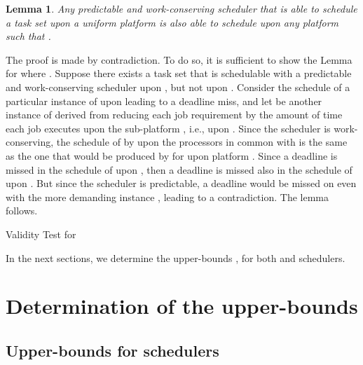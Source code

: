 \documentclass[10pt,english,a4paper]{article}
\newtheorem{lemma}{Lemma}
\newenvironment{proof}[1][Proof]{\begin{trivlist}
\item[\hskip \labelsep {\bfseries #1}]}{\end{trivlist}}
\newtheorem{validity test}{Validity Test}
\newcommand{\fin}{\hfill{\small }}     \newcommand{\oh}[1]{\ensuremath{\mathcal{0}{(#1)}}} \def\thefootnote{\arabic{footnote}}
\begin{document}
\begin{lemma}\label{no-anomalies}
Any predictable and work-conserving scheduler that is able to schedule a task set  upon a uniform platform  is also able to schedule  upon any platform  such that .
\end{lemma}

\begin{proof}
The proof is made by contradiction. To do so, it is sufficient to show the Lemma for  where . Suppose there exists a task set  that is schedulable with a predictable and work-conserving scheduler  upon , but not upon . Consider the schedule of a particular instance  of  upon  leading to a deadline miss, and let  be another instance of  derived from  reducing each job requirement by the amount of time each job executes upon the sub-platform , i.e., upon . Since the scheduler is work-conserving, the schedule of  by  upon the processors in common with  is the same as the one that would be produced by  for  upon platform . Since a deadline is missed in the schedule of  upon , then a deadline is missed also in the schedule of  upon . But since the scheduler is predictable, a deadline would be missed on  even with the more demanding instance , leading to a contradiction. The lemma follows. \fin
\end{proof}

\begin{algorithm}
\footnotesize
{}
\caption{Validity Test for }
\label{Validity test}
\end{algorithm}

In the next sections, we determine the upper-bounds ,  for both  and  schedulers.


\section{Determination of the upper-bounds }
\label{sec:proofs}

\subsection{Upper-bounds for  schedulers}
\label{sec:proofsFTP}
\end{document}
